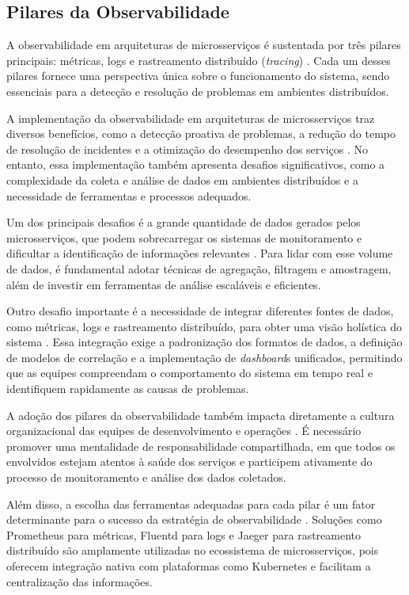 \subsection{Pilares da Observabilidade}

A observabilidade em arquiteturas de microsserviços é sustentada por três pilares principais: métricas, logs e rastreamento distribuído (\textit{tracing}) \cite{observability2023}. Cada um desses pilares fornece uma perspectiva única sobre o funcionamento do sistema, sendo essenciais para a detecção e resolução de problemas em ambientes distribuídos.

A implementação da observabilidade em arquiteturas de microsserviços traz diversos benefícios, como a detecção proativa de problemas, a redução do tempo de resolução de incidentes e a otimização do desempenho dos serviços \cite{observability2023}. No entanto, essa implementação também apresenta desafios significativos, como a complexidade da coleta e análise de dados em ambientes distribuídos e a necessidade de ferramentas e processos adequados.

Um dos principais desafios é a grande quantidade de dados gerados pelos microsserviços, que podem sobrecarregar os sistemas de monitoramento e dificultar a identificação de informações relevantes \cite{ahmed2022observability}. Para lidar com esse volume de dados, é fundamental adotar técnicas de agregação, filtragem e amostragem, além de investir em ferramentas de análise escaláveis e eficientes.

Outro desafio importante é a necessidade de integrar diferentes fontes de dados, como métricas, logs e rastreamento distribuído, para obter uma visão holística do sistema \cite{observability2023}. Essa integração exige a padronização dos formatos de dados, a definição de modelos de correlação e a implementação de \textit{dashboard}s unificados, permitindo que as equipes compreendam o comportamento do sistema em tempo real e identifiquem rapidamente as causas de problemas.

A adoção dos pilares da observabilidade também impacta diretamente a cultura organizacional das equipes de desenvolvimento e operações \cite{shekhar2023microservices}. É necessário promover uma mentalidade de responsabilidade compartilhada, em que todos os envolvidos estejam atentos à saúde dos serviços e participem ativamente do processo de monitoramento e análise dos dados coletados.

Além disso, a escolha das ferramentas adequadas para cada pilar é um fator determinante para o sucesso da estratégia de observabilidade \cite{observability2023}. Soluções como Prometheus para métricas, Fluentd para logs e Jaeger para rastreamento distribuído são amplamente utilizadas no ecossistema de microsserviços, pois oferecem integração nativa com plataformas como Kubernetes e facilitam a centralização das informações.

